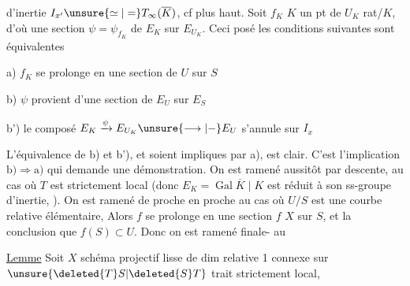 d'inertie $I_{x'}\unsure{\simeq|=}T_\infty(\overline K)$, cf plus haut. Soit $f_K$ $K$ un pt de $U_K$ rat/$K$, d'où une section $\psi=\psi_{f_K}$ de $E_K$ sur $E_{U_K}$. Ceci posé les conditions suivantes sont équivalentes

\noindent a) $f_K$ se prolonge en une section de $U$ sur $S$

\noindent b) $\psi$ provient d'une section de $E_U$ sur $E_S$

\noindent b') le composé $E_K\xrightarrow{\psi}E_{U_K}\unsure{\longrightarrow|-}E_U$ s'annule sur $I_x$


L'équivalence de b) et b'), et  soient impliques par a), est clair. C'est l'implication $\mathrm{b)}\Longrightarrow\mathrm{a)}$ qui demande une démonstration. On est ramené aussitôt\unsure{,} par descente, au cas  où $T$ est strictement local (donc $E_K=\operatorname{Gal}\overline K\mid K$ est réduit à son ss-groupe d'inertie, ). On est ramené de proche en proche au cas où $U/S$ est une courbe relative élémentaire,   \unsure{\deleted{,}|,}  Alors $f$ se prolonge en une section $f$   $X$ sur $S$, et la conclusion  que $f(S)\subset U$. Donc on est ramené finale-\newline {} au

\uline{Lemme} Soit $X$ schéma projectif lisse de dim relative 1 connexe sur $\unsure{\deleted{T}S|\deleted{S}T}$ trait strictement local,
